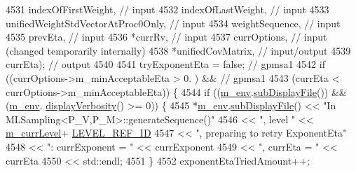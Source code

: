 \begin{DoxyCode}
{{4531                                 indexOfFirstWeight,                \textcolor{comment}{// input}
4532                                 indexOfLastWeight,                 \textcolor{comment}{// input}
4533                                 unifiedWeightStdVectorAtProc0Only, \textcolor{comment}{// input}
4534                                 weightSequence,                    \textcolor{comment}{// input}
4535                                 prevEta,                           \textcolor{comment}{// input}
4536                                 *currRv,                           \textcolor{comment}{// input}
4537                                 currOptions,                       \textcolor{comment}{// input (changed temporarily
       internally)}
4538                                 *unifiedCovMatrix,                 \textcolor{comment}{// input/output}
4539                                 currEta);                          \textcolor{comment}{// output}
4540 
4541     tryExponentEta = \textcolor{keyword}{false}; \textcolor{comment}{// gpmsa1}
4542     \textcolor{keywordflow}{if} ((currOptions->m\_minAcceptableEta > 0.     ) && \textcolor{comment}{// gpmsa1}
4543         (currEta < currOptions->m\_minAcceptableEta)) \{
4544       \textcolor{keywordflow}{if} ((\hyperlink{class_q_u_e_s_o_1_1_m_l_sampling_a13f1ca4fe9f94822fe572a743eaced1d}{m\_env}.\hyperlink{class_q_u_e_s_o_1_1_base_environment_a8a0064746ae8dddfece4229b9ad374d6}{subDisplayFile}()) && (\hyperlink{class_q_u_e_s_o_1_1_m_l_sampling_a13f1ca4fe9f94822fe572a743eaced1d}{m\_env}.
      \hyperlink{class_q_u_e_s_o_1_1_base_environment_a1fe5f244fc0316a0ab3e37463f108b96}{displayVerbosity}() >= 0)) \{
4545         *\hyperlink{class_q_u_e_s_o_1_1_m_l_sampling_a13f1ca4fe9f94822fe572a743eaced1d}{m\_env}.\hyperlink{class_q_u_e_s_o_1_1_base_environment_a8a0064746ae8dddfece4229b9ad374d6}{subDisplayFile}() << \textcolor{stringliteral}{"In MLSampling<P\_V,P\_M>::generateSequence()"}
4546                                 << \textcolor{stringliteral}{", level "} << \hyperlink{class_q_u_e_s_o_1_1_m_l_sampling_af9416874c856e50f3b35270e801f17e4}{m\_currLevel}+
      \hyperlink{_m_l_sampling_level_options_8h_a68d15eaf394d210effcf584b938206d3}{LEVEL\_REF\_ID}
4547                                 << \textcolor{stringliteral}{", preparing to retry ExponentEta"}
4548                                 << \textcolor{stringliteral}{": currExponent = "} << currExponent
4549                                 << \textcolor{stringliteral}{", currEta = "}      << currEta
4550                                 << std::endl;
4551       \}
4552       exponentEtaTriedAmount++;
}}
\end{DoxyCode}
